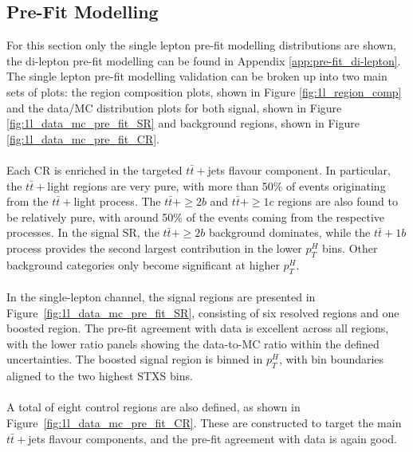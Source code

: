 \subsection{Pre-Fit Modelling}
For this section only the single lepton pre-fit modelling distributions are shown, the di-lepton pre-fit modelling can be found in Appendix \ref{app:pre-fit_di-lepton}. The single lepton pre-fit modelling validation can be broken up into two main sets of plots: the region composition plots, shown in Figure \ref{fig:1l_region_comp} and the data/MC distribution plots for both signal, shown in Figure \ref{fig:1l_data_mc_pre_fit_SR} and background regions, shown in Figure \ref{fig:1l_data_mc_pre_fit_CR}.\\
\\
Each CR is enriched in the targeted $t\bar{t}+$jets flavour component. In particular, the $t\bar{t}+$light regions are very pure, with more than 50\% of events originating from the $t\bar{t}+$light process. The $t\bar{t}+\geq 2b$ and $t\bar{t}+\geq 1c$ regions are also found to be relatively pure, with around 50\% of the events coming from the respective processes. In the signal SR, the $t\bar{t}+\geq 2b$ background dominates, while the $t\bar{t}+1b$ process provides the second largest contribution in the lower $p_{T}^{H}$ bins. Other background categories only become significant at higher $p_{T}^{H}$.\\
\\
In the single-lepton channel, the signal regions are presented in Figure~\ref{fig:1l_data_mc_pre_fit_SR}, consisting of six resolved regions and one boosted region. The pre-fit agreement with data is excellent across all regions, with the lower ratio panels showing the data-to-MC ratio within the defined uncertainties. The boosted signal region is binned in $p_{T}^{H}$, with bin boundaries aligned to the two highest STXS bins.\\  
\\
A total of eight control regions are also defined, as shown in Figure~\ref{fig:1l_data_mc_pre_fit_CR}. These are constructed to target the main $t\bar{t}+$jets flavour components, and the pre-fit agreement with data is again good.  

